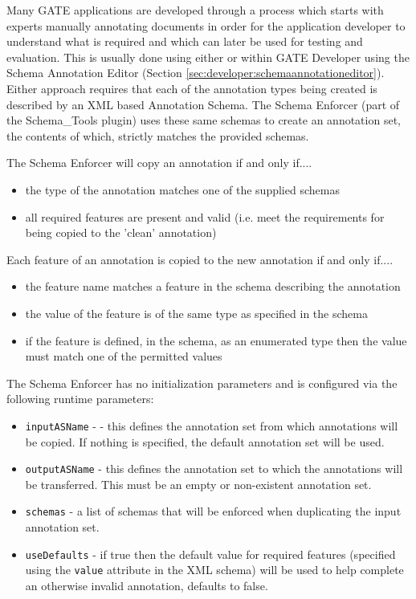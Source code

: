 Many GATE applications are developed through a process which starts with experts
manually annotating documents in order for the application developer to understand what
is required and which can later be used for testing and evaluation. This is usually done using either
 or within GATE Developer using
the Schema Annotation Editor (Section \ref{sec:developer:schemaannotationeditor}). Either
approach requires that each of the annotation types being created is described by an
XML based Annotation Schema. The Schema Enforcer (part of the Schema\_Tools plugin) uses these
same schemas to create an annotation set, the contents of which, strictly matches the provided schemas.

The Schema Enforcer will copy an annotation if and only if....
\begin{itemize}
\item the type of the annotation matches one of the supplied schemas
\item all required features are present and valid (i.e. meet the requirements
    for being copied to the 'clean' annotation)
\end{itemize}

Each feature of an annotation is copied to the new annotation if and only if....
\begin{itemize}
\item the feature name matches a feature in the schema describing the annotation
\item the value of the feature is of the same type as specified in the schema
\item if the feature is defined, in the schema, as an enumerated type then the
    value must match one of the permitted values
\end{itemize}

The Schema Enforcer has no initialization parameters and is configured via the following
runtime parameters:

\begin{itemize}
\item  \texttt{inputASName} -  - this defines the annotation set from which annotations will be
    copied. If nothing is specified, the default annotation set will be used.
\item \texttt{outputASName} - this defines the annotation set to which the annotations
    will be transferred. This must be an empty or non-existent annotation set.
\item \texttt{schemas} - a list of schemas that will be enforced when duplicating the input
    annotation set.
\item \texttt{useDefaults} - if true then the default value for required features (specified using the
    \texttt{value} attribute in the XML schema) will be used to help complete an otherwise invalid
    annotation, defaults to false.
\end{itemize}

